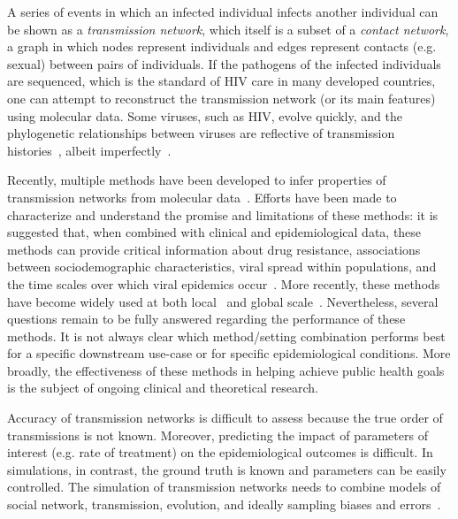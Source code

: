 A series of events in which an infected individual infects another individual can be shown as a \textit{transmission network}, which itself is a subset of a \textit{contact network}, a graph in which nodes represent individuals and edges represent contacts (e.g. sexual) between pairs of individuals. If the pathogens of the infected individuals are sequenced, which is the standard of \gls{HIV} care in many developed countries, one can attempt to reconstruct the transmission network (or its main features) using molecular data. Some viruses, such as \gls{HIV}, evolve quickly, and the phylogenetic relationships between viruses are reflective of transmission histories~\cite{Leitner1996}, albeit imperfectly~\cite{Ypma2013,Romero-Severson2014,Leitner2018}.

Recently, multiple methods have been developed to infer properties of transmission networks from molecular data~\cite{Prosperi2011,Ragonnet-Cronin2013,Pond2018}. Efforts have been made to characterize and understand the promise and limitations of these methods: it is suggested that, when combined with clinical and epidemiological data, these methods can provide critical information about drug resistance, associations between sociodemographic characteristics, viral spread within populations, and the time scales over which viral epidemics occur~\cite{Grabowski2014}. More recently, these methods have become widely used at both local~\cite{Campbell2017} and global scale~\cite{Wertheim2014}. Nevertheless, several questions remain to be fully answered regarding the performance of these methods.  It is not always clear which method/setting combination performs best for a specific downstream use-case or for specific epidemiological conditions.  More broadly, the effectiveness of these methods in helping achieve public health goals is the subject of ongoing clinical and theoretical research.

Accuracy of transmission networks is difficult to assess because the true order of transmissions is not known. Moreover, predicting the impact of parameters of interest (e.g. rate of treatment) on the epidemiological outcomes is difficult. In simulations, in contrast, the ground truth is known and parameters can be easily controlled. The simulation of transmission networks needs to combine models of social network, transmission, evolution, and ideally sampling biases and errors~\cite{Villandre2016}.

